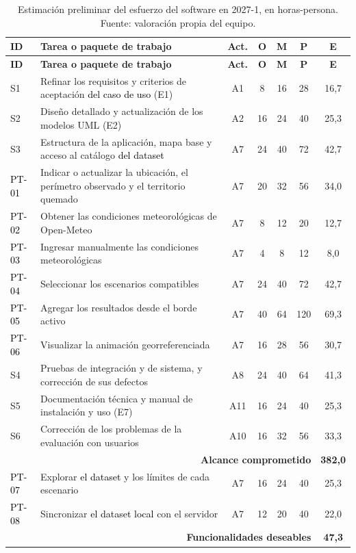 \begin{longtable}{|p{}|p{}|c|c|c|c|c|}
\caption{Estimación preliminar del esfuerzo del software en 2027-1, en horas-persona. Fuente: valoración propia del equipo.}\label{tab:esfuerzo-software}\\
\hline
\textbf{ID} & \textbf{Tarea o paquete de trabajo} & \textbf{Act.} & \textbf{O} & \textbf{M} & \textbf{P} & \textbf{E}\tabularnewline\hline
\endfirsthead
\hline
\textbf{ID} & \textbf{Tarea o paquete de trabajo} & \textbf{Act.} & \textbf{O} & \textbf{M} & \textbf{P} & \textbf{E}\tabularnewline\hline
\endhead
S1 & Refinar los requisitos y criterios de aceptación \textcolor{black}{del caso de uso} (E1) & A1 & 8 & 16 & 28 & 16,7\tabularnewline\hline
S2 & Diseño detallado y actualización de los modelos UML (E2) & A2 & 16 & 24 & 40 & 25,3\tabularnewline\hline
S3 & Estructura de la aplicación, mapa base y acceso al catálogo \textcolor{black}{del dataset} & A7 & 24 & 40 & 72 & 42,7\tabularnewline\hline
\textcolor{black}{PT-01} & Indicar o actualizar la ubicación, el perímetro observado y el territorio quemado & A7 & 20 & 32 & 56 & 34,0\tabularnewline\hline
\textcolor{black}{PT-02} & Obtener las condiciones meteorológicas de Open-Meteo & A7 & 8 & 12 & 20 & 12,7\tabularnewline\hline
\textcolor{black}{PT-03} & Ingresar manualmente las condiciones meteorológicas & A7 & 4 & 8 & 12 & 8,0\tabularnewline\hline
\textcolor{black}{PT-04} & Seleccionar los escenarios compatibles & A7 & 24 & 40 & 72 & 42,7\tabularnewline\hline
\textcolor{black}{PT-05} & Agregar los resultados desde el borde activo & A7 & 40 & 64 & 120 & 69,3\tabularnewline\hline
\textcolor{black}{PT-06} & Visualizar la animación georreferenciada& A7 & 16 & 28 & 56 & 30,7\tabularnewline\hline
S4 & Pruebas de integración y de sistema, y corrección de sus defectos & A8 & 24 & 40 & 64 & 41,3\tabularnewline\hline
S5 & Documentación técnica y manual de instalación y uso (E7) & A11 & 16 & 24 & 40 & 25,3\tabularnewline\hline
S6 & Corrección de los problemas de la evaluación con usuarios & A10 & 16 & 32 & 56 & 33,3\tabularnewline\hline
\multicolumn{6}{|r|}{\textbf{Alcance comprometido}} & \textbf{382,0}\tabularnewline\hline
\textcolor{black}{PT-07} & Explorar \textcolor{black}{el dataset} y los límites de cada escenario & A7 & 16 & 24 & 40 & 25,3\tabularnewline\hline
\textcolor{black}{PT-08} & Sincronizar \textcolor{black}{el dataset local} con el servidor & A7 & 12 & 20 & 40 & 22,0\tabularnewline\hline
\multicolumn{6}{|r|}{\textbf{Funcionalidades deseables}} & \textbf{47,3}\tabularnewline\hline
\end{longtable}


